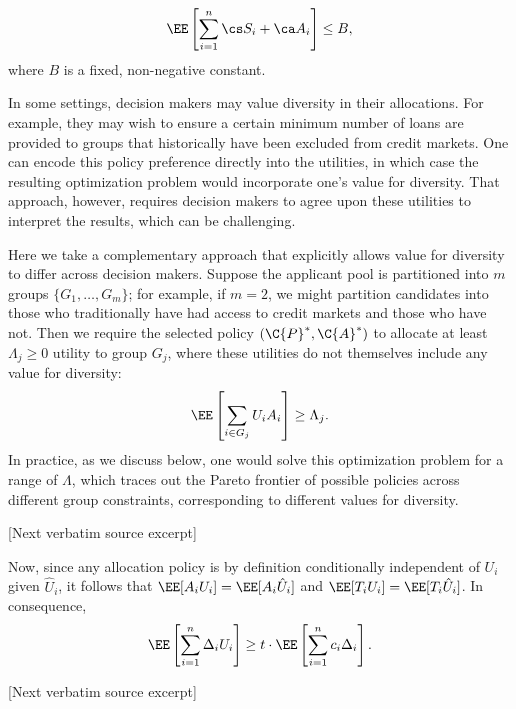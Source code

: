 \documentclass[10pt]{article}
\begin{document}
\begin{ReviewVerbatim}
\begin{equation}
\label{eq:def2}
    \EE \left[ \sum_{i = 1}^n \cs S_i + \ca  A_i \right] \leq B,
\end{equation}
where \(B\) is a fixed, non-negative constant.

In some settings, decision makers may value diversity in their allocations.
For example, they may wish to ensure a certain minimum number of loans are provided to groups that historically have been excluded from credit markets.
One can encode this policy preference directly into the utilities, in which case the resulting optimization problem would incorporate one's value for diversity.
That approach, however, requires decision makers to agree upon these utilities to interpret the results, which can be challenging.

Here we take a complementary approach that explicitly allows value for diversity to differ across decision makers.
Suppose the applicant pool is partitioned into \(m\) groups \(\{G_1, \ldots, G_m\}\);
for example, if \(m = 2\), we might partition candidates into those who traditionally have had access to credit markets and those who have not.
Then we require the selected policy \((\C{P}^*, \C{A}^*)\)
to allocate at least \(\Lambda_j \geq 0\) utility to group \(G_j\), where these utilities do not themselves include any value for diversity:
    \begin{equation}
    \label{eq:def3}
        \EE \left[ \sum_{i \in G_j} U_i A_i \right] \geq \Lambda_j.
    \end{equation}
In practice, as we discuss below, one would solve this optimization problem for a range of \(\Lambda\), which traces out the Pareto frontier of possible policies across different group constraints, corresponding to different values for diversity.

[Next verbatim source excerpt]

Now, since any allocation policy is by definition conditionally independent of \(U_i\) given \(\hat U_i\), it follows that \(\EE [A_i U_i] = \EE [A_i \hat U_i]\) and \(\EE [T_i U_i] = \EE [T_i \hat U_i]\). In consequence,
\begin{equation}
    \label{eq:key}
        \EE \left[ \sum_{i = 1}^n \Delta_i U_i \right] \geq t \cdot \EE \left[ \sum_{i = 1}^n c_i \Delta_i \right].
    \end{equation}

[Next verbatim source excerpt]


\end{ReviewVerbatim}
\end{document}
